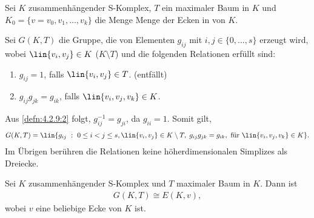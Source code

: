 \begin{defn}
\label{defn:4.2.9}
Sei $K$ zusammenhängender S-Komplex, $T$ ein maximaler Baum in $K$ und
$K_0=\{v=v_0,v_1,\ldots,v_k\}$ die Menge Menge der Ecken in von $K$.

Sei $G(K,T)$ die Gruppe, die von Elementen $g_{ij}$ mit $i,j\in\{0,\ldots,s\}$
erzeugt wird, wobei $\lin{v_i,v_j}\in K$ ($K\setminus T$) und die folgenden
Relationen erfüllt sind:
\begin{enumerate}[label=(\roman{*})]
  \item\label{defn:4.2.9:1} $g_{ij} = 1$, falls $\lin{v_i,v_j}\in T$. (entfällt)
  \item\label{defn:4.2.9:2} $g_{ij}g_{jk} = g_{ik}$, falls $\lin{v_i,v_j,v_k}\in
  K$.
\end{enumerate}
Aus \ref{defn:4.2.9:2} folgt, $g_{ij}^{-1} = g_{ji}$, da $g_{ii} = 1$. Somit
gilt,
\begin{align*}
G(K,T) = \lin{g_{ij}\ : \ 0\le i < j \le s, \lin{v_i,v_j}\in K\setminus T,\;
g_{ij}g_{jk}=g_{ik},\text{ für } \lin{v_i,v_j,v_k}\in K}.
\end{align*}
Im Übrigen berühren die Relationen keine höherdimensionalen Simplizes als
Dreiecke.\fishhere
\end{defn}
\begin{prop}
\label{prop:4.2.10}
Sei $K$ zusammenhängender S-Komplex und $T$ maximaler Baum in $K$. Dann ist
\begin{align*}
G(K,T)\cong E(K,v),
\end{align*}
wobei $v$ eine beliebige Ecke von $K$ ist.\fishhere
\end{prop}
